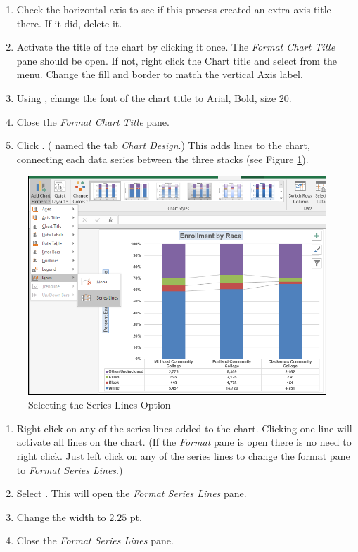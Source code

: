 \begin{enumerate}
	\item Check the horizontal axis to see if this process created an extra axis title there. If it did, delete it.
	\item Activate the title of the chart by clicking it once. The \textit{Format Chart Title} pane should be open. If not, right click the Chart title and select  from the menu. Change the fill and border to match the vertical Axis label.
	\item Using , change the font of the chart title to Arial, Bold, size $ 20 $.
	\item Close the \textit{Format Chart Title} pane.
	\item Click . ( named the tab \textit{Chart Design}.) This adds lines to the chart, connecting each data series between the three stacks (see Figure \ref{04:fig40}).
\end{enumerate}

\begin{figure}[H]
	\centering
	\includegraphics[width=\maxwidth{.95\linewidth}]{gfx/ch04_fig40}
	\caption{Selecting the Series Lines Option}
	\label{04:fig40}
\end{figure}

\begin{enumerate}
	\item Right click on any of the series lines added to the chart. Clicking one line will activate all lines on the chart. (If the \textit{Format} pane is open there is no need to right click. Just left click on any of the series lines to change the format pane to \textit{Format Series Lines}.)
	\item Select . This will open the \textit{Format Series Lines} pane.
	\item Change the width to $ 2.25 $ pt.
	\item Close the \textit{Format Series Lines} pane.
\end{enumerate}

